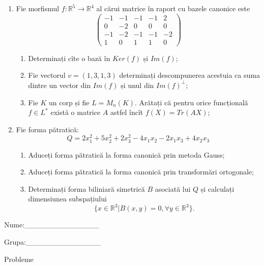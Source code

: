\documentclass{article}
\begin{document}
\begin{enumerate}
 \item Fie morfismul $f:\mathbb{R}^5 \to \mathbb{R}^4$ al cărui matrice în raport cu bazele canonice este
$$\begin{pmatrix}
-1&-1&-1&-1&2\\
0&-2&0&0&0\\
-1&-2&-1&-1&-2\\
1&0&1&1&0
\end{pmatrix}$$

\begin{enumerate}
\item Determinați cîte o bază în $Ker(f)$ și $Im(f)$;
\item Fie vectorul $v=(1,3,1,3)$ determinați descompunerea acestuia ca suma dintre un vector din $Im(f)$ și unul din $Im(f)^\perp$;
\item Fie $K$ un corp și fie $L=M_n(K)$. Arătați că pentru orice funcțională $f \in L^*$ există o matrice $A$ astfel încît $f(X)=Tr(AX)$;
\end{enumerate}
\item Fie forma pătratică:
$$Q= 2x_1^2+5x_2^2+2x_3^2-4x_1x_2-2x_1x_3+4x_2x_3$$

\begin{enumerate}
\item Aduceți forma pătratică la forma canonică prin metoda Gauss;
\item Aduceți forma pătratică la forma canonică prin transformări ortogonale;
\item Determinați forma biliniară simetrică $B$ asociată lui $Q$ și calculați dimensiunea subspațiului
$$\{x \in \mathbb{R}^3 | B(x,y)=0,\forall y \in \mathbb{R}^3\}.$$

\end{enumerate}
\end{enumerate}
\newpage
\begin{flushright}
Nume:\_\_\_\_\_\_\_\_\_\_\_\_\_\_
 
 
Grupa:\_\_\_\_\_\_\_\_\_\_\_\_\_\_
\end{flushright}
\begin{center}
\vspace{2cm}
{\Large Probleme}
\vspace{2cm}
\end{center}
\end{document}
